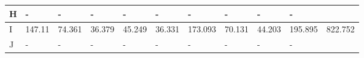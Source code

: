\begin{landscape}
\begin{longtable}[c]{|l|llllllllll|}
  H                                                                               & \multicolumn{1}{l|}{-}                                                              & \multicolumn{1}{l|}{-}                                                              & \multicolumn{1}{l|}{-}                                                              & \multicolumn{1}{l|}{-}                                                              & \multicolumn{1}{l|}{-}                                                              & \multicolumn{1}{l|}{-}                                                              & \multicolumn{1}{l|}{-}                                         & \multicolumn{1}{l|}{-}                                         & \multicolumn{1}{l|}{-}                                             &                                                                                        \\ \hline
  I                                                                               & \multicolumn{1}{l|}{147.11}                                                         & \multicolumn{1}{l|}{74.361}                                                         & \multicolumn{1}{l|}{36.379}                                                         & \multicolumn{1}{l|}{45.249}                                                         & \multicolumn{1}{l|}{36.331}                                                         & \multicolumn{1}{l|}{173.093}                                                        & \multicolumn{1}{l|}{70.131}                                    & \multicolumn{1}{l|}{44.203}                                    & \multicolumn{1}{l|}{195.895}                                       & 822.752                                                                                \\ \hline
  J                                                                               & \multicolumn{1}{l|}{-}                                                              & \multicolumn{1}{l|}{-}                                                              & \multicolumn{1}{l|}{-}                                                              & \multicolumn{1}{l|}{-}                                                              & \multicolumn{1}{l|}{-}                                                              & \multicolumn{1}{l|}{-}                                                              & \multicolumn{1}{l|}{-}                                         & \multicolumn{1}{l|}{-}                                         & \multicolumn{1}{l|}{-}                                             &                                                                                        \\ \hline

\end{longtable}
\end{landscape}
